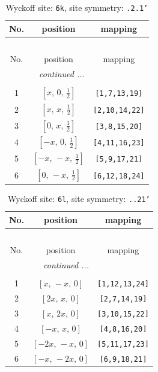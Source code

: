 \documentclass[fleqn,8pt]{jsarticle}
\begin{document}
\renewcommand{\arraystretch}{1.2}
\begin{longtable}{ccc}
\caption{Wyckoff site: {\tt 6k}, site symmetry: {\tt .2.1'}}
 \\
 \hline \hline
No. & position & mapping \\ \hline \endfirsthead

\multicolumn{2}{l}{\tablename\ \thetable{}} \\
 \hline \hline
No. & position & mapping \\ \hline \endhead

 \hline \hline
\multicolumn{2}{r}{\footnotesize\it continued ...} \\ \endfoot

 \hline \hline
\multicolumn{2}{r}{} \\ \endlastfoot

1 & $\left[ x,\, 0,\, \frac{1}{2} \right]$ & {\tt [1,7,13,19]} \\ \hline
2 & $\left[ x,\, x,\, \frac{1}{2} \right]$ & {\tt [2,10,14,22]} \\ \hline
3 & $\left[ 0,\, x,\, \frac{1}{2} \right]$ & {\tt [3,8,15,20]} \\ \hline
4 & $\left[ - x,\, 0,\, \frac{1}{2} \right]$ & {\tt [4,11,16,23]} \\ \hline
5 & $\left[ - x,\, - x,\, \frac{1}{2} \right]$ & {\tt [5,9,17,21]} \\ \hline
6 & $\left[ 0,\, - x,\, \frac{1}{2} \right]$ & {\tt [6,12,18,24]} \\
\end{longtable}
\renewcommand{\arraystretch}{1.2}
\begin{longtable}{ccc}
\caption{Wyckoff site: {\tt 6l}, site symmetry: {\tt ..21'}}
 \\
 \hline \hline
No. & position & mapping \\ \hline \endfirsthead

\multicolumn{2}{l}{\tablename\ \thetable{}} \\
 \hline \hline
No. & position & mapping \\ \hline \endhead

 \hline \hline
\multicolumn{2}{r}{\footnotesize\it continued ...} \\ \endfoot

 \hline \hline
\multicolumn{2}{r}{} \\ \endlastfoot

1 & $\left[ x,\, - x,\, 0 \right]$ & {\tt [1,12,13,24]} \\ \hline
2 & $\left[ 2 x,\, x,\, 0 \right]$ & {\tt [2,7,14,19]} \\ \hline
3 & $\left[ x,\, 2 x,\, 0 \right]$ & {\tt [3,10,15,22]} \\ \hline
4 & $\left[ - x,\, x,\, 0 \right]$ & {\tt [4,8,16,20]} \\ \hline
5 & $\left[ - 2 x,\, - x,\, 0 \right]$ & {\tt [5,11,17,23]} \\ \hline
6 & $\left[ - x,\, - 2 x,\, 0 \right]$ & {\tt [6,9,18,21]} \\
\end{longtable}
\end{document}
